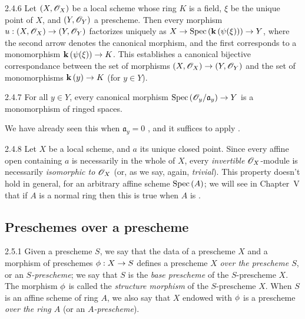 \begin{envs}[Corollary]{2.4.6}
\label{cor-1.2.4.6}
Let $(X,\mathscr{O}_X)$ be a local scheme whose ring $K$ is a field, $\xi$ be the unique point of
$X$, and $(Y,\mathscr{O}_Y)$ a prescheme. Then every morphism $u:(X,\mathscr{O}_X)\to(Y,\mathscr{O}_Y)$ factorizes
uniquely as $X\to{\mathop{\mathrm{Spec}}\nolimits}\,(\mathbf{k}\,(\psi(\xi)))\to Y$, where the second arrow denotes the canonical
morphism, and the first corresponds to a monomorphism $\mathbf{k}\,(\psi(\xi))\to K$.
This establishes a canonical bijective correspondance between the set of
morphisms $(X,\mathscr{O}_X)\to (Y,\mathscr{O}_Y)$ and the set of monomorphisms $\mathbf{k}\,(y)\to K$ (for
$y\in Y$).
\end{envs}
    
\begin{envs}[Corollary]{2.4.7}
\label{cor-1.2.4.7}
For all $y\in Y$, every canonical morphism
${\mathop{\mathrm{Spec}}\nolimits}\,(\mathscr{O}_y/\mathfrak{a}_y)\to Y$ is a monomorphism of ringed spaces.
\end{envs}
    
We have already seen this when $\mathfrak{a}_y=0$ , and it suffices
to apply .
    
\begin{env}[Remark]{2.4.8}
\label{rmk-1.2.4.8}
Let $X$ be a local scheme, and $a$ its unique
closed point.  Since every affine open containing $a$ is necessarily in the
whole of $X$, every \emph{invertible} $\mathscr{O}_X$-module  is
necessarily \emph{isomorphic to $\mathscr{O}_X$} (or, as we say, again, \emph{trivial}).
This property doesn't hold in general, for an arbitrary affine scheme
${\mathop{\mathrm{Spec}}\nolimits}\,(A)$; we will see in Chapter~V that if $A$ is a normal ring then this is
true when $A$ is .
\end{env}

\subsection{Preschemes over a prescheme}
\label{1-schemes-2.5}

\begin{envs}[Definition]{2.5.1}
\label{defn-1.2.5.1}
Given a prescheme $S$, we say that the data of a
prescheme $X$ and a morphism of preschemes $\phi:X\to S$ defines a
prescheme $X$ \emph{over the prescheme $S$}, or an \emph{$S$-prescheme}; we say
that $S$ is the \emph{base prescheme} of the $S$-prescheme $X$. The morphism
$\phi$ is called the \emph{structure morphism} of the $S$-prescheme $X$.
When $S$ is an affine scheme of ring $A$, we also say that $X$ endowed with
$\phi$ is a prescheme \emph{over the ring $A$} (or an \emph{$A$-prescheme}).
\end{envs}

